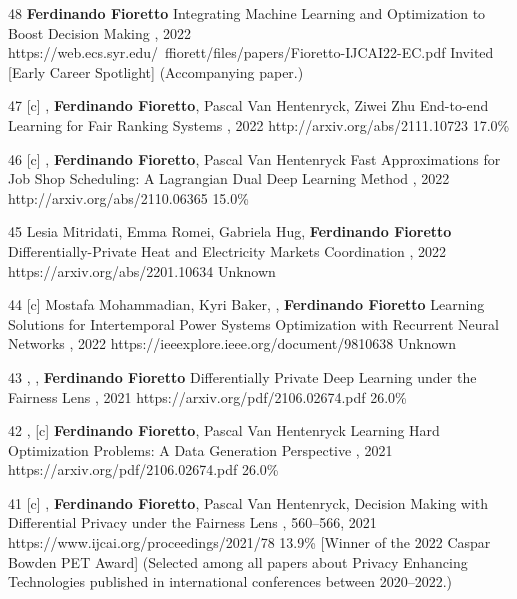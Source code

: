 \begin{pubs}
\confentryAwd
	{48} %
	{{\bf Ferdinando Fioretto}}
	{Integrating Machine Learning and Optimization to Boost Decision Making}
	{\procIJCAI, 2022}
	{https://web.ecs.syr.edu/~ffiorett/files/papers/Fioretto-IJCAI22-EC.pdf}	
	{Invited}
	{[Early Career Spotlight]}
	{(Accompanying paper.)}

\confentry
	{47} %
	{[c] , {\bf Ferdinando Fioretto}, Pascal Van Hentenryck, Ziwei Zhu}
	{End-to-end Learning for Fair Ranking Systems}
	{\procWWW, 2022}
	{http://arxiv.org/abs/2111.10723}	
	{17.0\%}

\confentry
	{46} %
	{[c] , {\bf Ferdinando Fioretto}, Pascal Van Hentenryck}
	{Fast Approximations for Job Shop Scheduling: A Lagrangian Dual Deep Learning Method}
	{\procAAAI, 2022}
	{http://arxiv.org/abs/2110.06365}
	{15.0\%}

\confentry
	{45} %
	{Lesia Mitridati, Emma Romei, Gabriela Hug, {\bf Ferdinando Fioretto}}
	{Differentially-Private Heat and Electricity Markets Coordination}
	{\procPMAPS, 2022}
	{https://arxiv.org/abs/2201.10634}
	{Unknown}

\confentry
	{44} %
	{[c] Mostafa Mohammadian, Kyri Baker, , {\bf Ferdinando Fioretto}}
	{Learning Solutions for Intertemporal Power Systems Optimization with Recurrent Neural Networks}
	{\procPMAPS, 2022}
	{https://ieeexplore.ieee.org/document/9810638}
	{Unknown}


\confentry 
	{43} %
	{, , {\bf Ferdinando Fioretto}}
	{Differentially Private Deep Learning under the Fairness Lens}
	{\procNeurIPS, 2021}
	{https://arxiv.org/pdf/2106.02674.pdf}
	{26.0\%} %

\confentry 
	{42} %
	{, [c] {\bf Ferdinando Fioretto}, Pascal Van Hentenryck}
	{Learning Hard Optimization Problems: A Data Generation Perspective}
	{\procNeurIPS, 2021}
	{https://arxiv.org/pdf/2106.02674.pdf}
	{26.0\%} %

\confentryAwd 
	{41} %
	{[c] , {\bf Ferdinando Fioretto}, Pascal Van Hentenryck, }
	{Decision Making with Differential Privacy under the Fairness Lens}
	{\procIJCAI, 560--566, 2021}
	{https://www.ijcai.org/proceedings/2021/78}
	{13.9\%} %
	{[Winner of the 2022 Caspar Bowden PET Award]}
	{(Selected among all papers about Privacy Enhancing Technologies published in international conferences between 2020--2022.)}


\end{pubs}
